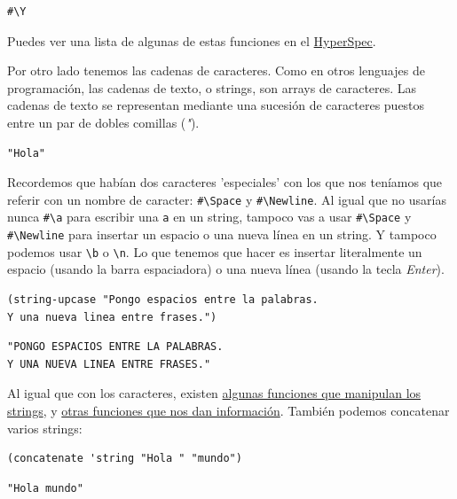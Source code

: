 \documentclass[11pt]{article}
\begin{document}
\begin{verbatim}
#\Y
\end{verbatim}


Puedes ver una lista de algunas de estas funciones en el \href{http://www.lispworks.com/documentation/HyperSpec/Body/13\_aa.htm}{HyperSpec}.

Por otro lado tenemos las cadenas de caracteres. Como en otros lenguajes de programación, las cadenas de texto, o strings, son arrays de caracteres. Las cadenas de texto se representan mediante una sucesión de caracteres puestos entre un par de dobles comillas (\emph{"}).

\begin{verbatim}
"Hola"
\end{verbatim}

Recordemos que habían dos caracteres 'especiales' con los que nos teníamos que referir con un nombre de caracter: \texttt{\#\textbackslash{}Space} y \texttt{\#\textbackslash{}Newline}. Al igual que no usarías nunca \texttt{\#\textbackslash{}a} para escribir una \texttt{a} en un string, tampoco vas a usar \texttt{\#\textbackslash{}Space} y \texttt{\#\textbackslash{}Newline} para insertar un espacio o una nueva línea en un string. Y tampoco podemos usar \texttt{\textbackslash{}b} o \texttt{\textbackslash{}n}. Lo que tenemos que hacer es insertar literalmente un espacio (usando la barra espaciadora) o una nueva línea (usando la tecla \emph{Enter}).

\begin{verbatim}
(string-upcase "Pongo espacios entre la palabras.
Y una nueva linea entre frases.")
\end{verbatim}

\begin{verbatim}
"PONGO ESPACIOS ENTRE LA PALABRAS.
Y UNA NUEVA LINEA ENTRE FRASES."
\end{verbatim}


Al igual que con los caracteres, existen \href{http://www.lispworks.com/documentation/HyperSpec/Body/f\_stg\_up.htm}{algunas funciones que manipulan los strings}, y \href{http://www.lispworks.com/documentation/HyperSpec/Body/f\_stgeq\_.htm}{otras funciones que nos dan información}. También podemos concatenar varios strings:

\begin{verbatim}
(concatenate 'string "Hola " "mundo")
\end{verbatim}

\begin{verbatim}
"Hola mundo"
\end{verbatim}
\end{document}
